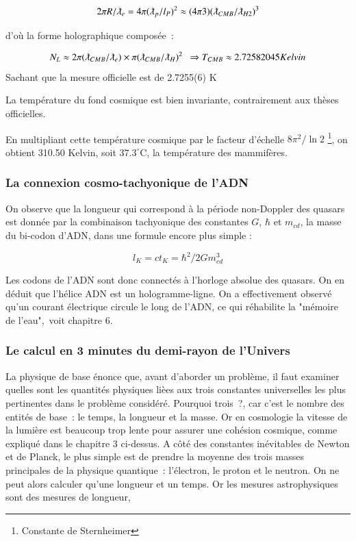 \documentclass[a4paper,12pt]{article}
\begin{document}
\begin{equation}
2\pi R/\lambdabar_e = 4\pi (\lambdabar_p /l_P)^2  \approx (4\pi 3) (\lambdabar_{CMB}/\lambdabar_{H2})^3
\end{equation}


d'où la forme holographique composée :

\begin{equation}
N_L \approx 2\pi (\lambdabar_{CMB}/\lambdabar_{e}) \times \pi (\lambdabar_{CMB}/\lambdabar_{H})^2   ~~  \Rightarrow T_{CMB}  \approx 2.72582045  Kelvin
\end{equation}    
Sachant que la mesure officielle est de 2.7255(6) K

La température du fond cosmique est bien invariante, contrairement aux thèses officielles.

En multipliant cette température cosmique par le facteur d'échelle $8 \pi^2/\ln{2}$ \footnote{Constante de Sternheimer}, on obtient 310.50 Kelvin, soit $37.3^{\circ}$C, la température des mammifères.


\subsubsection{La connexion cosmo-tachyonique de l'ADN} 

      On observe que la longueur qui correspond à la période non-Doppler des quasars est donnée par la combinaison tachyonique des constantes $G$,  $\hbar$ et $m_{cd}$, la masse du bi-codon d'ADN, dans une formule encore plus simple :
      
\begin{equation}
l_K = ct_K  = \hbar^2/2Gm_{cd}^3 
\end{equation}      
     
Les codons de l'ADN sont donc connectés à l'horloge absolue des quasars. On en déduit que l'hélice ADN est un hologramme-ligne. On a effectivement observé qu'un courant électrique circule le long de l'ADN, ce qui réhabilite la "mémoire de l'eau", voit chapitre 6.




\subsubsection{Le calcul en 3 minutes du demi-rayon de l’Univers}

La physique de base énonce que, avant d’aborder un problème, il faut examiner quelles sont les quantités physiques lièes aux trois constantes universelles les plus pertinentes dans le problème considéré. Pourquoi trois ?, car c’est le nombre des entités de base : le  temps, la longueur et la masse. Or en cosmologie la vitesse de la lumière est beaucoup trop lente pour assurer une cohésion cosmique, comme expliqué dans le chapitre 3 ci-dessus. A côté des constantes inévitables de Newton et de Planck, le plus simple est de prendre la moyenne des trois masses principales de la physique quantique : l'électron, le proton et le neutron. On ne peut alors calculer qu’une longueur et un temps. Or les mesures astrophysiques sont des mesures de longueur, 
\end{document}
